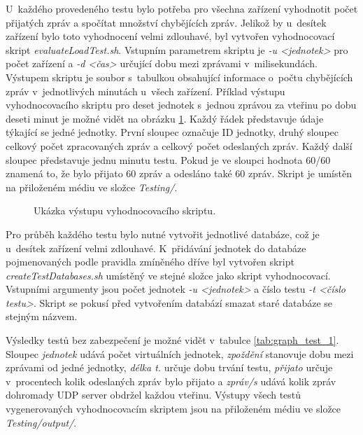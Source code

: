 U~každého provedeného testu bylo potřeba pro všechna zařízení vyhodnotit počet přijatých zpráv a spočítat množství chybějících zpráv. Jelikož by u~desítek zařízení bylo toto vyhodnocení velmi zdlouhavé, byl vytvořen vyhodnocovací skript \textit{evaluateLoadTest.sh}. Vstupním parametrem skriptu je \textit{-u <jednotek>} pro počet zařízení a \textit{-d <čas>} určující dobu mezi zprávami v~milisekundách. Výstupem skriptu je soubor s~tabulkou obsahující informace o~počtu chybějících zpráv v~jednotlivých minutách u~všech zařízení. Příklad výstupu vyhodnocovacího skriptu pro deset jednotek s~jednou zprávou za vteřinu po dobu deseti minut je možné vidět na obrázku \ref{pic:load_verif_script}. Každý řádek představuje údaje týkající se jedné jednotky. První sloupec označuje ID jednotky, druhý sloupec celkový počet zpracovaných zpráv a celkový počet odeslaných zpráv. Každý další sloupec představuje jednu minutu testu. Pokud je ve sloupci hodnota 60/60 znamená to, že bylo přijato 60 zpráv a odesláno také 60 zpráv. Skript je umístěn na přiloženém médiu ve složce \textit{Testing/}. 

\begin{figure}[h]
  \centering
  \caption{Ukázka výstupu vyhodnocovacího skriptu.}\label{pic:load_verif_script}
\end{figure}

Pro průběh každého testu bylo nutné vytvořit jednotlivé databáze, což je u~desítek zařízení velmi zdlouhavé. K~přidávání jednotek do databáze pojmenovaných podle pravidla zmíněného dříve byl vytvořen skript \textit{createTestDatabases.sh} umístěný ve stejné složce jako skript vyhodnocovací. Vstupními argumenty jsou počet jednotek \textit{-u <jednotek>} a číslo testu \textit{-t <číslo testu>}. Skript se pokusí před vytvořením databází smazat staré databáze se stejným názvem. 

Výsledky testů bez zabezpečení je možné vidět v~tabulce \ref{tab:graph_test_1}. Sloupec \textit{jednotek} udává počet virtuálních jednotek, \textit{zpoždění} stanovuje dobu mezi zprávami od jedné jednotky, \textit{délka t.} určuje dobu trvání testu, \textit{přijato} určuje v~procentech kolik odeslaných zpráv bylo přijato a \textit{zpráv/s} udává kolik zpráv dohromady UDP server obdržel každou vteřinu. Výstupy všech testů vygenerovaných vyhodnocovacím skriptem jsou na přiloženém médiu ve složce \textit{Testing/output/}. 


